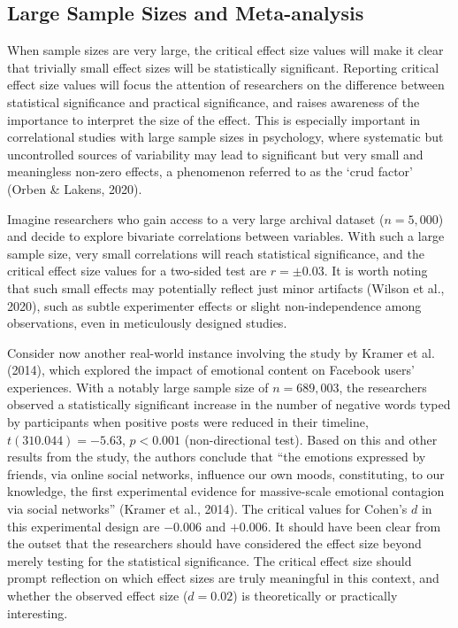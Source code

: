 \documentclass[
  man,floatsintext]{apa7}
\begin{document}
\hypertarget{large-sample-sizes-and-meta-analysis}{%
\subsection{Large Sample Sizes and Meta-analysis}\label{large-sample-sizes-and-meta-analysis}}

When sample sizes are very large, the critical effect size values will make it clear that trivially small effect sizes will be statistically significant. Reporting critical effect size values will focus the attention of researchers on the difference between statistical significance and practical significance, and raises awareness of the importance to interpret the size of the effect. This is especially important in correlational studies with large sample sizes in psychology, where systematic but uncontrolled sources of variability may lead to significant but very small and meaningless non-zero effects, a phenomenon referred to as the `crud factor' (Orben \& Lakens, 2020).

Imagine researchers who gain access to a very large archival dataset (\(n = 5,000\)) and decide to explore bivariate correlations between variables. With such a large sample size, very small correlations will reach statistical significance, and the critical effect size values for a two-sided test are \(r = \pm 0.03\). It is worth noting that such small effects may potentially reflect just minor artifacts (Wilson et al., 2020), such as subtle experimenter effects or slight non-independence among observations, even in meticulously designed studies.

Consider now another real-world instance involving the study by Kramer et al. (2014), which explored the impact of emotional content on Facebook users' experiences. With a notably large sample size of \(n = 689,003\), the researchers observed a statistically significant increase in the number of negative words typed by participants when positive posts were reduced in their timeline, \(t(310.044) = −5.63\), \(p < 0.001\) (non-directional test). Based on this and other results from the study, the authors conclude that ``the emotions expressed by friends, via online social networks, influence our own moods, constituting, to our knowledge, the first experimental evidence for massive-scale emotional contagion via social networks'' (Kramer et al., 2014). The critical values for Cohen's \(d\) in this experimental design are \(-0.006\) and \(+0.006\). It should have been clear from the outset that the researchers should have considered the effect size beyond merely testing for the statistical significance. The critical effect size should prompt reflection on which effect sizes are truly meaningful in this context, and whether the observed effect size (\(d = 0.02\)) is theoretically or practically interesting.
\end{document}
